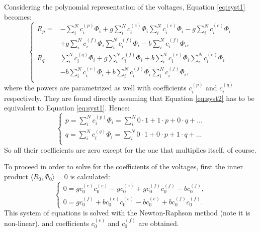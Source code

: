 Considering the polynomial representation of the voltages, Equation \ref{eq:syst1} becomes:
\begin{equation}
   \begin{cases}
      R_p = & - \sum_i^N c_i^{(p)} \Phi_i + g \sum_i^N c_i^{(e)} \Phi_i \sum_i^N c_i^{(e)} \Phi_i - g \sum_i^N c_i^{(e)} \Phi_i \\
                                  & + g \sum_i^N c_i^{(f)} \Phi_i \sum_i^N c_i^{(f)} \Phi_i - b \sum_i^N c_i^{(f)} \Phi_i, \\ 
      R_q = & \sum_i^N c_i^{(q)} \Phi_i + g \sum_i^N c_i^{(f)} \Phi_i + b \sum_i^N c_i^{(e)} \Phi_i \sum_i^N c_i^{(e)} \Phi_i \\
          &- b \sum_i^N c_i^{(e)} \Phi_i + b \sum_i^N c_i^{(f)} \Phi_i \sum_i^N c_i^{(f)} \Phi_i, \\
   \end{cases}
   \label{eq:syst2}
\end{equation}
where the powers are parametrized as well with coefficients $c_i^{(p)}$ and $c_i^{(q)}$ respectively. They are found directly assuming that Equation \ref{eq:syst2} has to be equivalent to Equation \ref{eq:syst1}. Hence:
\begin{equation}
   \begin{cases}
   p = \sum_i^N c_i^{(p)}\Phi_i = \sum_i^N 0 \cdot 1 + 1 \cdot p + 0 \cdot q + ... \\
   q = \sum_i^N c_i^{(q)}\Phi_i = \sum_i^N 0 \cdot 1 + 0 \cdot p + 1 \cdot q + ... \\
\end{cases}
\end{equation}
So all their coefficients are zero except for the one that multiplies itself, of course.

To proceed in order to solve for the coefficients of the voltages, first the inner product $\langle R_{0}, \Phi_0 \rangle = 0$ is calculated:
\begin{equation}
   \begin{cases}
      0 = g c_0^{(e)} c_0^{(e)} - g c_0^{(e)} + g c_0^{(f)} c_0^{(f)} - b c_0^{(f)}, \\
      0 = g c_0^{(f)} + b c_0^{(e)} c_0^{(e)} - b c_0^{(e)} + b c_0^{(f)}c_0^{(f)}.
   \end{cases}
\end{equation}
This system of equations is solved with the Newton-Raphson method (note it is non-linear), and coefficients $c_0^{(e)}$ and $c_0^{(f)}$ are obtained.

